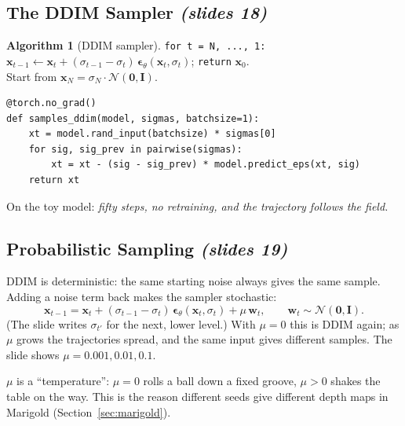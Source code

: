 \documentclass[11pt,a4paper]{article}
\newcommand{\bx}{\bm{x}}
\newcommand{\beps}{\bm{\epsilon}}
\newcommand{\slides}[1]{\texorpdfstring{\emph{(slides #1)}}{(slides #1)}}
\theoremstyle{plain}
\theoremstyle{definition}
\newtheorem{algorithm}[theorem]{Algorithm}
\numberwithin{equation}{section}
\begin{document}
\subsection{The DDIM Sampler \slides{18}}
\begin{algorithm}[DDIM sampler]\label{alg:ddim}
\texttt{for t = N, ..., 1:} \quad $\bx_{t-1}\leftarrow\bx_t+(\sigma_{t-1}-\sigma_t)\,\beps_\theta(\bx_t,\sigma_t)$; \quad \texttt{return} $\bx_0$. \\
Start from $\bx_N=\sigma_N\cdot\mathcal N(\bm0,\bm I)$.
\end{algorithm}
\begin{lstlisting}
@torch.no_grad()
def samples_ddim(model, sigmas, batchsize=1):
    xt = model.rand_input(batchsize) * sigmas[0]
    for sig, sig_prev in pairwise(sigmas):
        xt = xt - (sig - sig_prev) * model.predict_eps(xt, sig)
    return xt
\end{lstlisting}
On the toy model: \emph{fifty steps, no retraining, and the trajectory follows the field.}

\subsection{Probabilistic Sampling \slides{19}}
DDIM is deterministic: the same starting noise always gives the same sample. Adding a noise term back makes the sampler stochastic:
\begin{equation}
\bx_{t-1}=\bx_t+(\sigma_{t-1}-\sigma_t)\,\beps_\theta(\bx_t,\sigma_t)+\mu\,\bm w_t,\qquad \bm w_t\sim\mathcal N(\bm0,\bm I).
\end{equation}
(The slide writes $\sigma_{t'}$ for the next, lower level.) With $\mu=0$ this is DDIM again; as $\mu$ grows the trajectories spread, and the same input gives different samples. The slide shows $\mu=0.001,0.01,0.1$.

\begin{intuition}
$\mu$ is a ``temperature'': $\mu=0$ rolls a ball down a fixed groove, $\mu>0$ shakes the table on the way. This is the reason different seeds give different depth maps in Marigold (Section~\ref{sec:marigold}).
\end{intuition}
\end{document}
